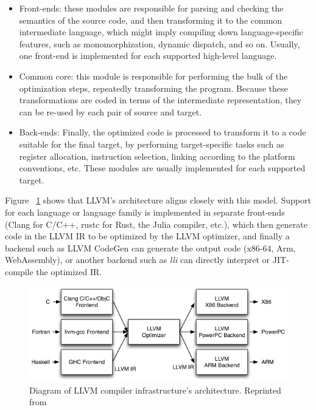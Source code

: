 \begin{itemize}
    \item Front-ends: these modules are responsible for parsing and checking the semantics of the source code, and then transforming it to the common intermediate language, which might imply compiling down language-specific features, such as monomorphization, dynamic dispatch, and so on. Usually, one front-end is implemented for each supported high-level language.
    \item Common core: this module is responsible for performing the bulk of the optimization steps, repeatedly transforming the program. Because these transformations are coded in terms of the intermediate representation, they can be re-used by each pair of source and target.
    \item Back-ends: Finally, the optimized code is processed to transform it to a code suitable for the final target, by performing target-specific tasks such as register allocation, instruction selection, linking according to the platform conventions, etc. These modules are usually implemented for each supported target.
\end{itemize}

Figure ~\ref{fig:llvm_arch} shows that LLVM's architecture aligns closely with this model. Support for each language or language family is implemented in separate front-ends (Clang for C/C++, rustc for Rust, the Julia compiler, etc.), which then generate code in the LLVM IR to be optimized by the LLVM optimizer, and finally a backend such as LLVM CodeGen \cite{LLVMCodeGen} can generate the output code (x86-64, Arm, WebAssembly), or another backend such as \textit{lli} \cite{LLVMDirectExecution} can directly interpret or JIT-compile the optimized IR.

\begin{figure}
    \centering
    \includegraphics[width=\textwidth]{figures/llvm_arch.png}
    \caption{Diagram of LLVM compiler infrastructure's architecture. Reprinted from \cite{LattnerAOSA}}
    \label{fig:llvm_arch}
\end{figure}

